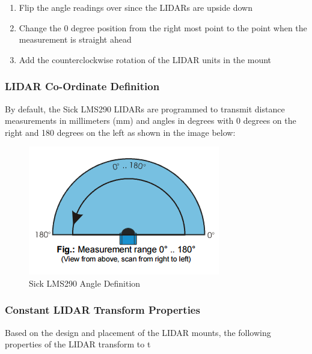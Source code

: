 \begin{enumerate}
\item Flip the angle readings over since the LIDARs are upside down
\item Change the 0 degree position from the right most point to the point when the measurement is straight ahead
\item Add the counterclockwise rotation of the LIDAR units in the mount
\end{enumerate}

\subsubsection{LIDAR Co-Ordinate Definition}
By default, the Sick LMS290 LIDARs are programmed to transmit distance measurements in millimeters (mm) and angles in degrees with 0 degrees on the right and 180 degrees on the left as shown in the image below:

\newpage
\begin{figure}[h!]
\centering
\includegraphics[scale=.8]{Photos/LIDAR_AngleDef.png}
\caption[Sick LMS290 Angle Definition]{Sick LMS290 Angle Definition \protect \footnotemark}
\label{fig:wholefish}
\end{figure} 

\subsubsection{Constant LIDAR Transform Properties}
Based on the design and placement of the LIDAR mounts, the following properties of the LIDAR transform to t